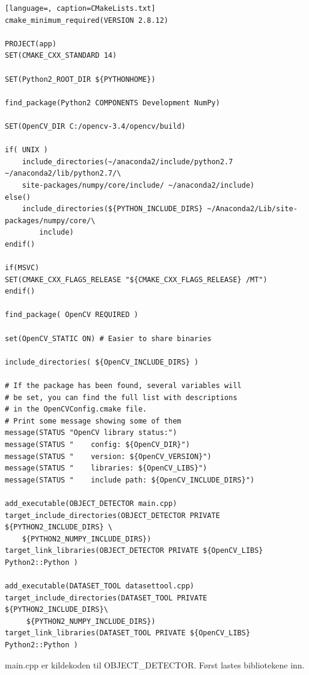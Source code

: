 \begin{lstlisting}[language=, caption=CMakeLists.txt]
cmake_minimum_required(VERSION 2.8.12)

PROJECT(app)
SET(CMAKE_CXX_STANDARD 14)

SET(Python2_ROOT_DIR ${PYTHONHOME})

find_package(Python2 COMPONENTS Development NumPy)

SET(OpenCV_DIR C:/opencv-3.4/opencv/build)

if( UNIX )
    include_directories(~/anaconda2/include/python2.7 ~/anaconda2/lib/python2.7/\
    site-packages/numpy/core/include/ ~/anaconda2/include)
else()
    include_directories(${PYTHON_INCLUDE_DIRS} ~/Anaconda2/Lib/site-packages/numpy/core/\
    	include)
endif()

if(MSVC)
SET(CMAKE_CXX_FLAGS_RELEASE "${CMAKE_CXX_FLAGS_RELEASE} /MT")
endif()

find_package( OpenCV REQUIRED )

set(OpenCV_STATIC ON) # Easier to share binaries

include_directories( ${OpenCV_INCLUDE_DIRS} )

# If the package has been found, several variables will
# be set, you can find the full list with descriptions
# in the OpenCVConfig.cmake file.
# Print some message showing some of them
message(STATUS "OpenCV library status:")
message(STATUS "    config: ${OpenCV_DIR}")
message(STATUS "    version: ${OpenCV_VERSION}")
message(STATUS "    libraries: ${OpenCV_LIBS}")
message(STATUS "    include path: ${OpenCV_INCLUDE_DIRS}")

add_executable(OBJECT_DETECTOR main.cpp)
target_include_directories(OBJECT_DETECTOR PRIVATE ${PYTHON2_INCLUDE_DIRS} \
	${PYTHON2_NUMPY_INCLUDE_DIRS})
target_link_libraries(OBJECT_DETECTOR PRIVATE ${OpenCV_LIBS} Python2::Python )

add_executable(DATASET_TOOL datasettool.cpp)
target_include_directories(DATASET_TOOL PRIVATE ${PYTHON2_INCLUDE_DIRS}\
	 ${PYTHON2_NUMPY_INCLUDE_DIRS})
target_link_libraries(DATASET_TOOL PRIVATE ${OpenCV_LIBS} Python2::Python )
\end{lstlisting}

main.cpp er kildekoden til OBJECT\_DETECTOR. Først lastes bibliotekene inn.

